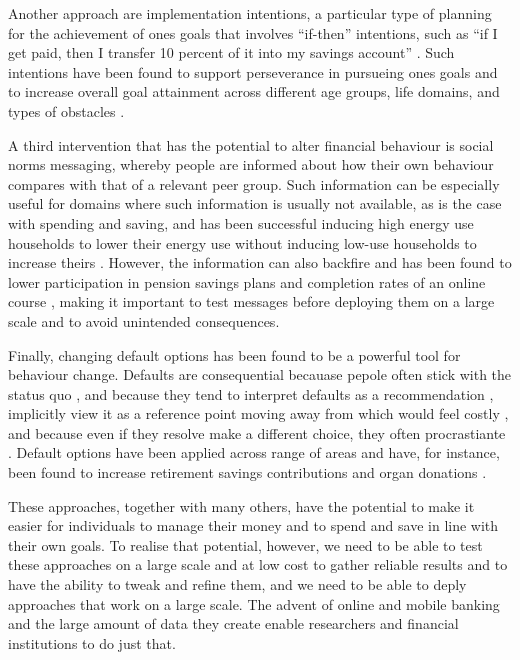 Another approach are implementation intentions, a particular type of planning
for the achievement of ones goals that involves ``if-then'' intentions, such as
``if I get paid, then I transfer 10 percent of it into my savings account''
\citep{gollwitzer2006implementation, rogers2015beyond}. Such intentions have
been found to support perseverance in pursueing ones goals
\citep{oettingen2010strategies} and to increase overall goal attainment across
different age groups, life domains, and types of obstacles
\citep{gollwitzer2006implementation}.

A third intervention that has the potential to alter financial behaviour is
social norms messaging, whereby people are informed about how their own
behaviour compares with that of a relevant peer group. Such information can be
especially useful for domains where such information is usually not available,
as is the case with spending and saving, and has been successful inducing high
energy use households to lower their energy use without inducing low-use
households to increase theirs \citep{schultz2007constructive,
allcott2011social, allcott2014short, brandon2017effects}. However, the
information can also backfire and has been found to lower participation in
pension savings plans \citep{beshears2015effect} and completion rates of an
online course \citep{rogers2016discouraged}, making it important to test
messages before deploying them on a large scale and to avoid unintended
consequences.

Finally, changing default options has been found to be a powerful tool for
behaviour change. Defaults are consequential becauase pepole often stick
with the status quo \citet{samuelson1988status}, and because they tend to
interpret defaults as a recommendation \citep{mckenzie2006recommendations},
implicitly view it as a reference point moving away from which would feel
costly \citet{johnson2003defaults, kahneman1979prospect}, and because even if
they resolve make a different choice, they often procrastiante
\citet{carroll2009optimal, ericson2017interaction}. Default options have been
applied across range of areas and have, for instance, been found to increase
retirement savings contributions \citep{madrian2001power,
beshears2009importance} and organ donations \citep{johnson2003defaults,
gimbel2003presumed, abadie2006impact}.

These approaches, together with many others, have the potential to make it
easier for individuals to manage their money and to spend and save in line with
their own goals. To realise that potential, however, we need to be able to test
these approaches on a large scale and at low cost to gather reliable results
and to have the ability to tweak and refine them, and we need to be able to
deply approaches that work on a large scale. The advent of online and mobile
banking and the large amount of data they create enable researchers and
financial institutions to do just that.


